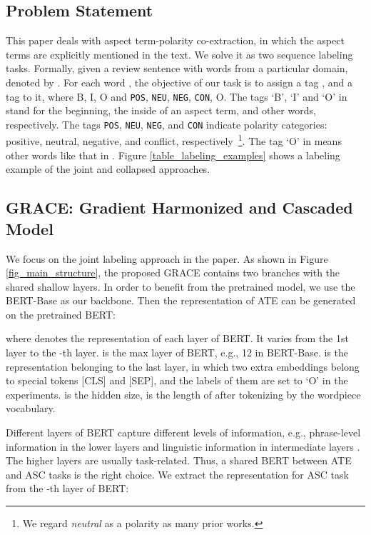 \documentclass[11pt,a4paper]{article}
\begin{document}
\subsection{Problem Statement}
This paper deals with aspect term-polarity co-extraction, in which the aspect terms are explicitly mentioned in the text. We solve it as two sequence labeling tasks. Formally, given a review sentence  with  words from a particular domain, denoted by . For each word , the objective of our task is to assign a tag , and a tag  to it, where B, I, O and \texttt{POS}, \texttt{NEU}, \texttt{NEG}, \texttt{CON}, O. The tags `B', `I' and `O' in  stand for the beginning, the inside of an aspect term, and other words, respectively. The tags \texttt{POS}, \texttt{NEU}, \texttt{NEG}, and \texttt{CON} indicate polarity categories: positive, neutral, negative, and conflict, respectively~\footnote{We regard \textit{neutral} as a polarity as many prior works.}. The tag `O' in  means other words like that in . Figure \ref{table_labeling_examples} shows a labeling example of the joint and collapsed approaches.

\subsection{GRACE: Gradient Harmonized and Cascaded Model}
\label{sec_grace_mdoel}
We focus on the joint labeling approach in the paper. As shown in Figure \ref{fig_main_structure}, the proposed GRACE contains two branches with the shared shallow layers. In order to benefit from the pretrained model, we use the BERT-Base as our backbone. Then the representation  of ATE can be generated on the pretrained BERT:

where  denotes the representation of each layer of BERT. It varies from the 1st layer to the -th layer.  is the max layer of BERT, e.g., 12 in BERT-Base.   is the representation  belonging to the last layer, in which two extra embeddings belong to special tokens [CLS] and [SEP], and the labels of them are set to `O' in the experiments.  is the hidden size,  is the length of  after tokenizing by the wordpiece vocabulary.

Different layers of BERT capture different levels of information, e.g., phrase-level information in the lower layers and linguistic information in intermediate layers \cite{Jawahar2019}. The higher layers are usually task-related. Thus, a shared BERT between ATE and ASC tasks is the right choice. We extract the representation  for ASC task from the -th layer of BERT:
\end{document}
